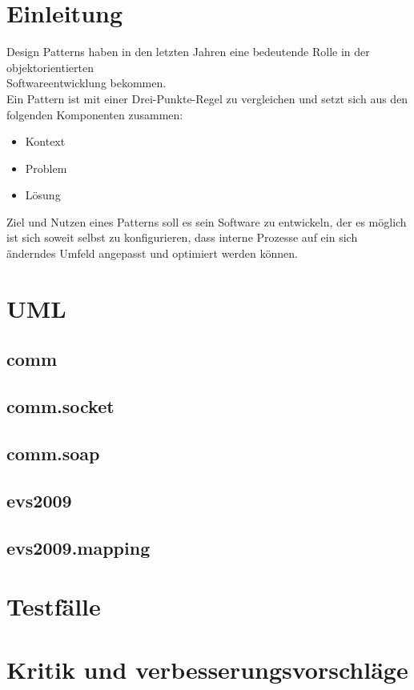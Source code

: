 \documentclass[a4paper]{article}
\begin{document}
\newpage
\section{Einleitung}
Design Patterns haben in den letzten Jahren eine bedeutende Rolle in der objektorientierten\\
Softwareentwicklung bekommen.\\
Ein Pattern ist mit einer Drei-Punkte-Regel zu vergleichen und setzt sich aus den folgenden Komponenten zusammen:
\begin{itemize}
	\item Kontext
	\item Problem
	\item Lösung
\end{itemize}
Ziel und Nutzen eines Patterns soll es sein Software zu entwickeln, der es möglich ist sich soweit selbst zu konfigurieren,
dass interne Prozesse auf ein sich änderndes Umfeld angepasst und optimiert werden können.
\section{UML}
	\subsection{comm}
	\subsection{comm.socket}
	\subsection{comm.soap}
	\subsection{evs2009}
	\subsection{evs2009.mapping}
\section{Testfälle}
\section{Kritik und verbesserungsvorschläge}
		
\end{document}
